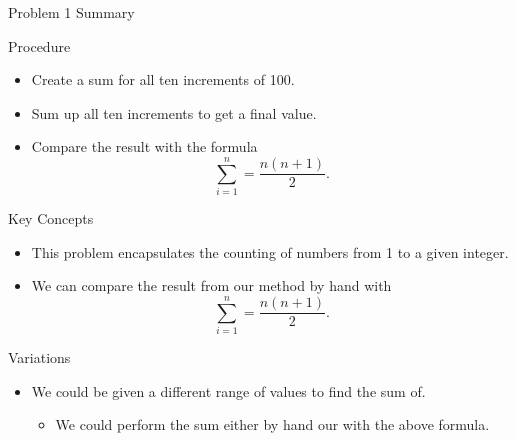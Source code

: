 \begin{summary}{Problem 1 Summary}
    \begin{statement}{Procedure}
        \begin{itemize}
            \item Create a sum for all ten increments of 100.
            \item Sum up all ten increments to get a final value.
            \item Compare the result with the formula
            \begin{equation*}
                \sum_{i = 1}^{n} = \frac{n(n + 1)}{2}.
            \end{equation*}
        \end{itemize}
    \end{statement}
    \begin{statement}{Key Concepts}
        \begin{itemize}
            \item This problem encapsulates the counting of numbers from 1 to a given integer.
            \item We can compare the result from our method by hand with
            \begin{equation*}
                \sum_{i = 1}^{n} = \frac{n(n + 1)}{2}.
            \end{equation*}
        \end{itemize}
    \end{statement}
    \begin{statement}{Variations}
        \begin{itemize}
            \item We could be given a different range of values to find the sum of.
            \begin{itemize}
                \item We could perform the sum either by hand our with the above formula.
            \end{itemize}
        \end{itemize}
    \end{statement}
\end{summary}

